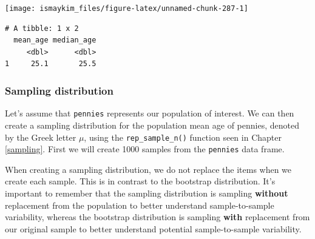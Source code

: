 \documentclass[12pt, krantz2,]{krantz}
\makeatletter
\newenvironment{Shaded}{\begin{snugshade}}{\end{snugshade}}
\newcommand{\DataTypeTok}[1]{\textcolor[rgb]{0.27,0.27,0.27}{#1}}
\newcommand{\DecValTok}[1]{\textcolor[rgb]{0.06,0.06,0.06}{#1}}
\newcommand{\KeywordTok}[1]{\textcolor[rgb]{0.27,0.27,0.27}{\textbf{#1}}}
\newcommand{\NormalTok}[1]{#1}
\newcommand{\OperatorTok}[1]{\textcolor[rgb]{0.43,0.43,0.43}{\textbf{#1}}}
\newcommand{\OtherTok}[1]{\textcolor[rgb]{0.37,0.37,0.37}{#1}}
\newcommand{\StringTok}[1]{\textcolor[rgb]{0.5,0.5,0.5}{#1}}
\newenvironment{kframe}{%
\medskip{}
\setlength{\fboxsep}{.8em}
 \def\at@end@of@kframe{}%
 \ifinner\ifhmode%
  \def\at@end@of@kframe{\end{minipage}}%
  \begin{minipage}{\columnwidth}%
 \fi\fi%
 \def\FrameCommand##1{\hskip\@totalleftmargin \hskip-\fboxsep
 \colorbox{shadecolor}{##1}\hskip-\fboxsep
     \hskip-\linewidth \hskip-\@totalleftmargin \hskip\columnwidth}%
 \MakeFramed {\advance\hsize-\width
   \@totalleftmargin\z@ \linewidth\hsize
   \@setminipage}}%
 {\par\unskip\endMakeFramed%
 \at@end@of@kframe}
\renewenvironment{Shaded}{\begin{kframe}}{\end{kframe}}
\makeatother
\begin{document}
\begin{center}\texttt{[image: ismaykim\_files/figure-latex/unnamed-chunk-287-1]} \end{center}

\begin{Shaded}
\end{Shaded}

\begin{verbatim}
# A tibble: 1 x 2
  mean_age median_age
     <dbl>      <dbl>
1     25.1       25.5
\end{verbatim}

\hypertarget{sampling-distribution}{%
\subsubsection*{Sampling distribution}\label{sampling-distribution}}


Let's assume that \texttt{pennies} represents our population of interest. We can then create a sampling distribution for the population mean age of pennies, denoted by the Greek letter \(\mu\), using the \texttt{rep\_sample\_n()} function seen in Chapter \ref{sampling}. First we will create 1000 samples from the \texttt{pennies} data frame.

\begin{Shaded}
\end{Shaded}

When creating a sampling distribution, we do not replace the items when we create each sample. This is in contrast to the bootstrap distribution. It's important to remember that the sampling distribution is sampling \textbf{without} replacement from the population to better understand sample-to-sample variability, whereas the bootstrap distribution is sampling \textbf{with} replacement from our original sample to better understand potential sample-to-sample variability.
\end{document}
